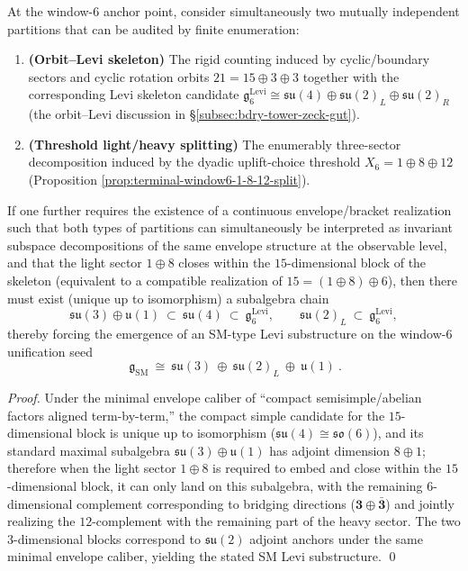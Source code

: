 \begin{proposition}\label{prop:window6-common-refinement-sm-levi}
At the window-\(6\) anchor point, consider simultaneously two mutually independent partitions that can be audited by finite enumeration:
\begin{enumerate}
  \item \textbf{(Orbit--Levi skeleton)} The rigid counting induced by cyclic/boundary sectors and cyclic rotation orbits
  \(
  21=15\oplus 3\oplus 3
  \)
  together with the corresponding Levi skeleton candidate
  \(
  \mathfrak g_6^{\mathrm{Levi}}\cong \mathfrak{su}(4)\oplus\mathfrak{su}(2)_L\oplus\mathfrak{su}(2)_R
  \)
  (the orbit--Levi discussion in \S\ref{subsec:bdry-tower-zeck-gut}).
  \item \textbf{(Threshold light/heavy splitting)} The enumerably three-sector decomposition induced by the dyadic uplift-choice threshold
  \(
  X_6=1\oplus 8\oplus 12
  \)
  (Proposition \ref{prop:terminal-window6-1-8-12-split}).
\end{enumerate}
If one further requires the existence of a continuous envelope/bracket realization such that both types of partitions can simultaneously be interpreted as invariant subspace decompositions of the same envelope structure at the observable level,
and that the light sector \(1\oplus 8\) closes within the \(15\)-dimensional block of the skeleton (equivalent to a compatible realization of \(15=(1\oplus 8)\oplus 6\)),
then there must exist (unique up to isomorphism) a subalgebra chain
\[
\mathfrak{su}(3)\oplus\mathfrak u(1)\ \subset\ \mathfrak{su}(4)\ \subset\ \mathfrak g_6^{\mathrm{Levi}},
\qquad
\mathfrak{su}(2)_L\ \subset\ \mathfrak g_6^{\mathrm{Levi}},
\]
thereby forcing the emergence of an SM-type Levi substructure on the window-\(6\) unification seed
\[
\boxed{\ \mathfrak g_{\mathrm{SM}}\ \cong\ \mathfrak{su}(3)\ \oplus\ \mathfrak{su}(2)_L\ \oplus\ \mathfrak u(1)\ }.
\]
\end{proposition}
\begin{proof}
Under the minimal envelope caliber of ``compact semisimple/abelian factors aligned term-by-term,'' the compact simple candidate for the \(15\)-dimensional block is unique up to isomorphism (\(\mathfrak{su}(4)\cong\mathfrak{so}(6)\)),
and its standard maximal subalgebra \(\mathfrak{su}(3)\oplus\mathfrak u(1)\) has adjoint dimension \(8\oplus 1\);
therefore when the light sector \(1\oplus 8\) is required to embed and close within the \(15\)-dimensional block, it can only land on this subalgebra,
with the remaining \(6\)-dimensional complement corresponding to bridging directions (\(\mathbf3\oplus\bar{\mathbf3}\)) and jointly realizing the \(12\)-complement with the remaining part of the heavy sector.
The two \(3\)-dimensional blocks correspond to \(\mathfrak{su}(2)\) adjoint anchors under the same minimal envelope caliber, yielding the stated SM Levi substructure. \qed
\end{proof}

